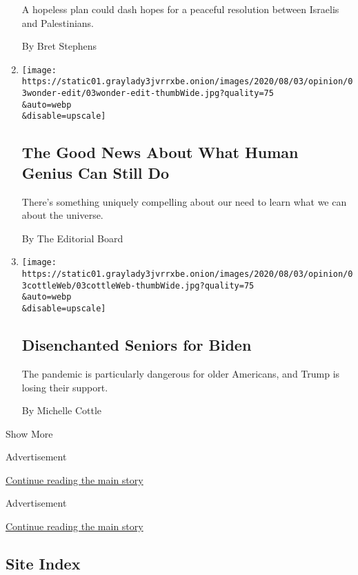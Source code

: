 \begin{enumerate}
  A hopeless plan could dash hopes for a peaceful resolution between
  Israelis and Palestinians.

  By Bret Stephens
\item
  \href{/2020/08/03/opinion/spacex-stonehenge-mars.html}{}

  \texttt{[image: https://static01.graylady3jvrrxbe.onion/images/2020/08/03/opinion/03wonder-edit/03wonder-edit-thumbWide.jpg?quality=75\\\&auto=webp\\\&disable=upscale]}

  \hypertarget{the-good-news-about-what-human-genius-can-still-do}{%
  \subsection{The Good News About What Human Genius Can Still
  Do}\label{the-good-news-about-what-human-genius-can-still-do}}

  There's something uniquely compelling about our need to learn what we
  can about the universe.

  By The Editorial Board
\item
  \href{/2020/08/03/opinion/senior-voters-biden-trump-2020.html}{}

  \texttt{[image: https://static01.graylady3jvrrxbe.onion/images/2020/08/03/opinion/03cottleWeb/03cottleWeb-thumbWide.jpg?quality=75\\\&auto=webp\\\&disable=upscale]}

  \hypertarget{disenchanted-seniors-for-biden}{%
  \subsection{Disenchanted Seniors for
  Biden}\label{disenchanted-seniors-for-biden}}

  The pandemic is particularly dangerous for older Americans, and Trump
  is losing their support.

  By Michelle Cottle
\end{enumerate}

Show More

Advertisement

\protect\hyperlink{after-mid2}{Continue reading the main story}

Advertisement

\protect\hyperlink{after-mktg}{Continue reading the main story}

\hypertarget{site-index}{%
\subsection{Site Index}\label{site-index}}

